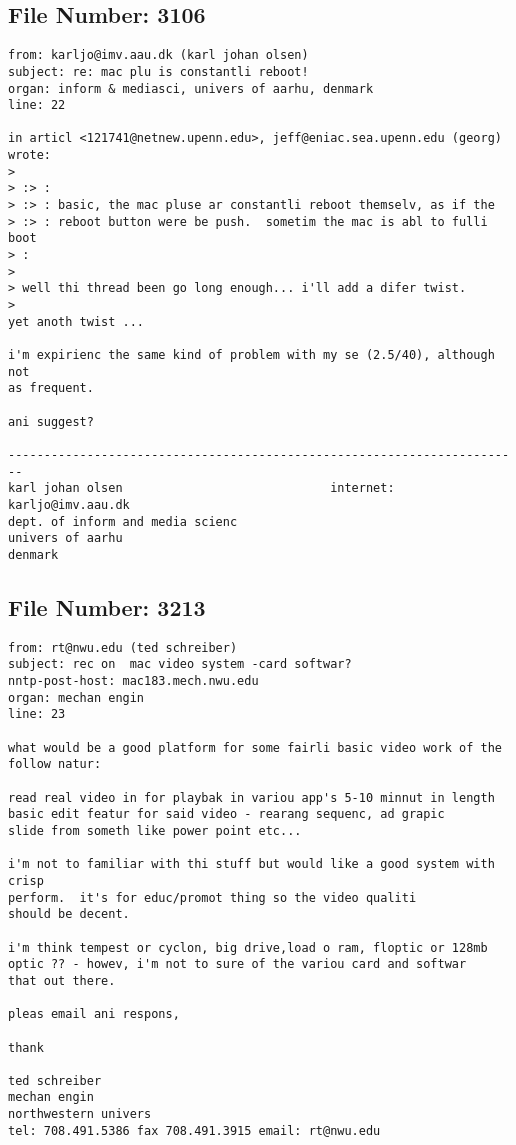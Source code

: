 \subsection{File Number: 3106}
\begin{verbatim}
from: karljo@imv.aau.dk (karl johan olsen)
subject: re: mac plu is constantli reboot!
organ: inform & mediasci, univers of aarhu, denmark
line: 22

in articl <121741@netnew.upenn.edu>, jeff@eniac.sea.upenn.edu (georg)
wrote:
> 
> :> :
> :> : basic, the mac pluse ar constantli reboot themselv, as if the
> :> : reboot button were be push.  sometim the mac is abl to fulli boot
> :
> 
> well thi thread been go long enough... i'll add a difer twist.
> 
yet anoth twist ...

i'm expirienc the same kind of problem with my se (2.5/40), although not
as frequent.

ani suggest?

------------------------------------------------------------------------
karl johan olsen                             internet: karljo@imv.aau.dk
dept. of inform and media scienc          
univers of aarhu
denmark
\end{verbatim}
\subsection{File Number: 3213}
\begin{verbatim}
from: rt@nwu.edu (ted schreiber)
subject: rec on  mac video system -card softwar?
nntp-post-host: mac183.mech.nwu.edu
organ: mechan engin
line: 23

what would be a good platform for some fairli basic video work of the
follow natur:

read real video in for playbak in variou app's 5-10 minnut in length
basic edit featur for said video - rearang sequenc, ad grapic
slide from someth like power point etc... 

i'm not to familiar with thi stuff but would like a good system with crisp
perform.  it's for educ/promot thing so the video qualiti
should be decent.

i'm think tempest or cyclon, big drive,load o ram, floptic or 128mb
optic ?? - howev, i'm not to sure of the variou card and softwar
that out there.

pleas email ani respons,

thank

ted schreiber
mechan engin 
northwestern univers
tel: 708.491.5386 fax 708.491.3915 email: rt@nwu.edu
\end{verbatim}
